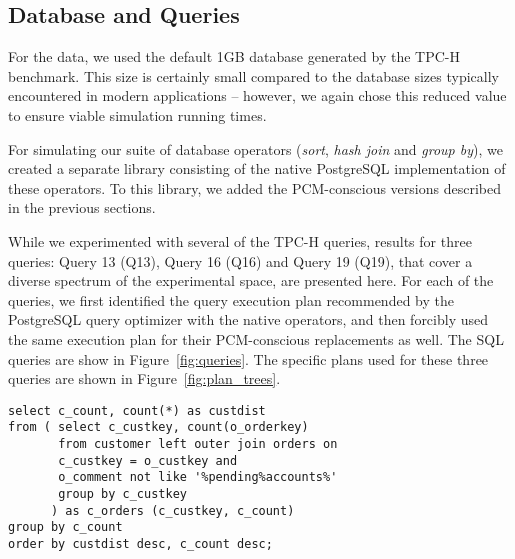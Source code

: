 \subsection{Database and Queries}
For the data, we used the default 1GB database generated by the TPC-H
benchmark.  This size is certainly small compared to the database sizes
typically encountered in modern applications -- however, we again chose
this reduced value to ensure viable simulation running times.

\begin{comment}
Notwithstanding, to ensure that our results were not skewed 
as an outcome,  we used scaled down versions of the hardware simulation parameters
from \cite{wear}, taking care to preserve the size ratios between adjacent
memory devices.
\end{comment}

For simulating our suite of database operators (\textit{sort},
\textit{hash join} and \textit{group by}), we created a separate
library consisting of the native PostgreSQL implementation of these
operators. To this library, we added the PCM-conscious versions described in
the previous sections.


While we experimented with several of the TPC-H queries, results for
three queries: Query 13 (Q13), Query 16 (Q16) and Query 19 (Q19), that
cover a diverse spectrum of the experimental space, are presented here.
For each of the queries, we first identified the query execution plan
recommended by the PostgreSQL query optimizer with the native operators,
and then forcibly used the same execution plan for their PCM-conscious
replacements as well. The SQL queries are show in Figure~\ref{fig:queries}. The specific plans used for these three queries
are shown in Figure~\ref{fig:plan_trees}.

   \lstset{width=\textwidth,
          escapechar=@,
          language=SQL,
          basicstyle=\scriptsize
          }

\newsavebox{\firstlisting}
\begin{lrbox}{\firstlisting}%
\begin{lstlisting}
select c_count, count(*) as custdist
from ( select c_custkey, count(o_orderkey)
       from customer left outer join orders on 
       c_custkey = o_custkey and 
       o_comment not like '%pending%accounts%'
       group by c_custkey
      ) as c_orders (c_custkey, c_count)
group by c_count
order by custdist desc, c_count desc;
\end{lstlisting}
\end{lrbox}


